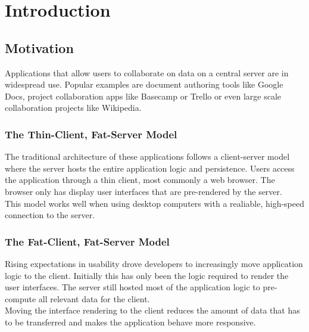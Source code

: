 
\chapter{Introduction}\label{intro}

\section{Motivation}
Applications that allow users to collaborate on data on a central server are in widespread use.
Popular examples are document authoring tools like Google Docs, project collaboration apps like Basecamp or Trello or even large scale collaboration projects like Wikipedia.\\
\subsection{The Thin-Client, Fat-Server Model}
The traditional architecture of these applications follows a client-server model where the server hosts the entire application logic and persistence.
Users access the application through a thin client, most commonly a web browser.
The browser only has display user interfaces that are pre-rendered by the server.\\
This model works well when using desktop computers with a realiable, high-speed connection to the server.\\

\subsection{The Fat-Client, Fat-Server Model}
Rising expectations in usability drove developers to increasingly move application logic to the client.
Initially this has only been the logic required to render the user interfaces.
The server still hosted most of the application logic to pre-compute all relevant data for the client.\\
Moving the interface rendering to the client reduces the amount of data that has to be transferred and makes the application behave more responsive.

